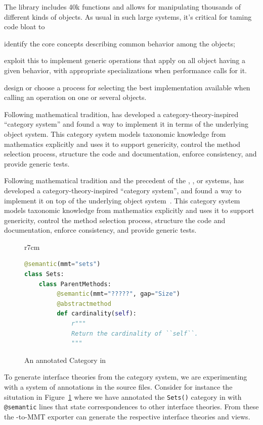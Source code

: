 The \Sage library includes 40k functions and allows for manipulating
thousands of different kinds of objects. As usual in such large
systems, it’s critical for taming code bloat to
\begin{inparaenum}[\em i\rm)]
\item identify the core concepts describing common behavior among the objects;
\item exploit this to implement generic operations that apply on all object having a given
  behavior, with appropriate specializations when performance calls for it.
\item design or choose a process for selecting the best implementation available when
  calling an operation on one or several objects.
\end{inparaenum}
Following mathematical tradition, \Sage has developed a category-theory-inspired
``category system'' and found a way to implement it in terms of the underlying \Python
object system. This category system models
taxonomic knowledge from mathematics explicitly and uses it to support genericity, control
the method selection process, structure the code and documentation, enforce consistency,
and provide generic tests.

Following mathematical tradition and the precedent of the \Axiom,
\Fricas, or \MuPAD systems, \Sage has developed a
category-theory-inspired ``category system'', and found a way to
implement it on top of the underlying \Python object
system~\cite{Sage.Categories}.
%
This category system models taxonomic knowledge from mathematics
explicitly and uses it to support genericity, control the method
selection process, structure the code and documentation, enforce
consistency, and provide generic tests.

\begin{figure}r{7cm}\vspace*{-2.5em}
\begin{lstlisting}[language=Python]
@semantic(mmt="sets")
class Sets:
    class ParentMethods:
         @semantic(mmt="?????", gap="Size")
         @abstractmethod
         def cardinality(self):
             r"""
             Return the cardinality of ``self``.
             """
\end{lstlisting}
\vspace*{-.5em}
\caption{An annotated Category in \Sage}\label{fig:anncat}\vspace*{-1.5em}
\end{figure}
To generate interface theories from the \Sage category system, we are experimenting with a
system of annotations in the \Sage source files. Consider for instance the situtation in
Figure~\ref{fig:anncat} where we have annotated the \texttt{Sets()} category in \Sage
with \texttt{@semantic} lines that state correspondences to other interface theories. From
these the \Sage-to-MMT exporter can generate the respective interface theories and views.

